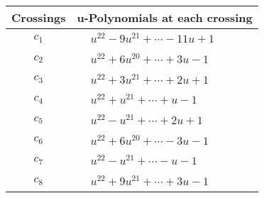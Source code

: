 \documentclass[1p]{elsarticle_modified}
\theoremstyle{definition}
\begin{document}
\begin{tabular}{m{50pt}|m{274pt}}
Crossings & \hspace{64pt}u-Polynomials at each crossing \\
\hline $$\begin{aligned}c_{1}\end{aligned}$$&$\begin{aligned}
&u^{22}-9 u^{21}+\cdots-11 u+1
\end{aligned}$\\
\hline $$\begin{aligned}c_{2}\end{aligned}$$&$\begin{aligned}
&u^{22}+6 u^{20}+\cdots+3 u-1
\end{aligned}$\\
\hline $$\begin{aligned}c_{3}\end{aligned}$$&$\begin{aligned}
&u^{22}+3 u^{21}+\cdots+2 u+1
\end{aligned}$\\
\hline $$\begin{aligned}c_{4}\end{aligned}$$&$\begin{aligned}
&u^{22}+u^{21}+\cdots+u-1
\end{aligned}$\\
\hline $$\begin{aligned}c_{5}\end{aligned}$$&$\begin{aligned}
&u^{22}- u^{21}+\cdots+2 u+1
\end{aligned}$\\
\hline $$\begin{aligned}c_{6}\end{aligned}$$&$\begin{aligned}
&u^{22}+6 u^{20}+\cdots-3 u-1
\end{aligned}$\\
\hline $$\begin{aligned}c_{7}\end{aligned}$$&$\begin{aligned}
&u^{22}- u^{21}+\cdots- u-1
\end{aligned}$\\
\hline $$\begin{aligned}c_{8}\end{aligned}$$&$\begin{aligned}
&u^{22}+9 u^{21}+\cdots+3 u-1
\end{aligned}$\\

\end{tabular}
\end{document}
